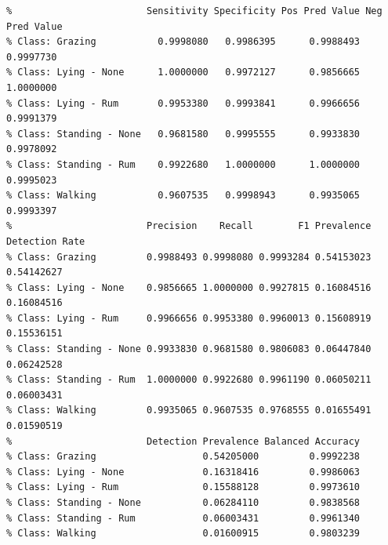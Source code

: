 \documentclass[
]{article}
\begin{document}
\begin{verbatim}
%                        Sensitivity Specificity Pos Pred Value Neg Pred Value
% Class: Grazing           0.9998080   0.9986395      0.9988493      0.9997730
% Class: Lying - None      1.0000000   0.9972127      0.9856665      1.0000000
% Class: Lying - Rum       0.9953380   0.9993841      0.9966656      0.9991379
% Class: Standing - None   0.9681580   0.9995555      0.9933830      0.9978092
% Class: Standing - Rum    0.9922680   1.0000000      1.0000000      0.9995023
% Class: Walking           0.9607535   0.9998943      0.9935065      0.9993397
%                        Precision    Recall        F1 Prevalence Detection Rate
% Class: Grazing         0.9988493 0.9998080 0.9993284 0.54153023     0.54142627
% Class: Lying - None    0.9856665 1.0000000 0.9927815 0.16084516     0.16084516
% Class: Lying - Rum     0.9966656 0.9953380 0.9960013 0.15608919     0.15536151
% Class: Standing - None 0.9933830 0.9681580 0.9806083 0.06447840     0.06242528
% Class: Standing - Rum  1.0000000 0.9922680 0.9961190 0.06050211     0.06003431
% Class: Walking         0.9935065 0.9607535 0.9768555 0.01655491     0.01590519
%                        Detection Prevalence Balanced Accuracy
% Class: Grazing                   0.54205000         0.9992238
% Class: Lying - None              0.16318416         0.9986063
% Class: Lying - Rum               0.15588128         0.9973610
% Class: Standing - None           0.06284110         0.9838568
% Class: Standing - Rum            0.06003431         0.9961340
% Class: Walking                   0.01600915         0.9803239
\end{verbatim}
\end{document}

